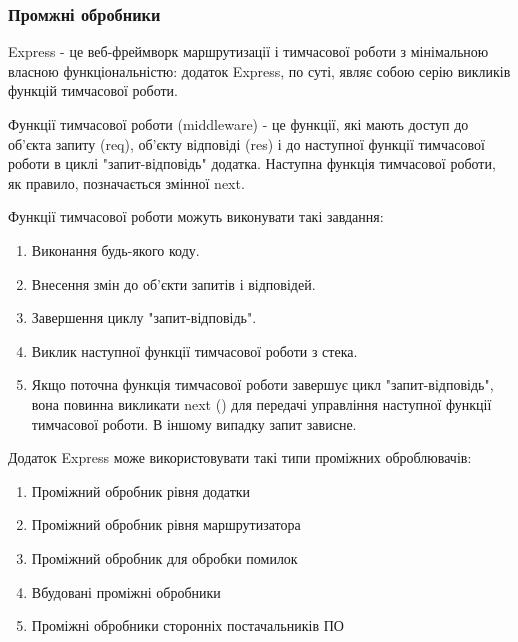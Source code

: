 \subsubsection{Промжні обробники}

Express - це веб-фреймворк маршрутизації і тимчасової роботи з мінімальною власною функціональністю: додаток Express, по суті, являє собою серію викликів функцій тимчасової роботи.

Функції тимчасової роботи (middleware) - це функції, які мають доступ до об'єкта запиту (req), об'єкту відповіді (res) і до наступної функції тимчасової роботи в циклі "запит-відповідь" додатка. Наступна функція тимчасової роботи, як правило, позначається змінної next.

Функції тимчасової роботи можуть виконувати такі завдання:

\begin{enumerate}
	\item Виконання будь-якого коду.
	\item Внесення змін до об'єкти запитів і відповідей.
	\item Завершення циклу "запит-відповідь".
	\item Виклик наступної функції тимчасової роботи з стека.
	\item Якщо поточна функція тимчасової роботи завершує цикл "запит-відповідь", вона повинна викликати next () для передачі управління наступної функції тимчасової роботи. В іншому випадку запит зависне.
\end{enumerate}	

Додаток Express може використовувати такі типи проміжних оброблювачів:

\begin{enumerate}
	\item Проміжний обробник рівня додатки
	\item Проміжний обробник рівня маршрутизатора
	\item Проміжний обробник для обробки помилок
	\item Вбудовані проміжні обробники
	\item Проміжні обробники сторонніх постачальників ПО
\end{enumerate}	
